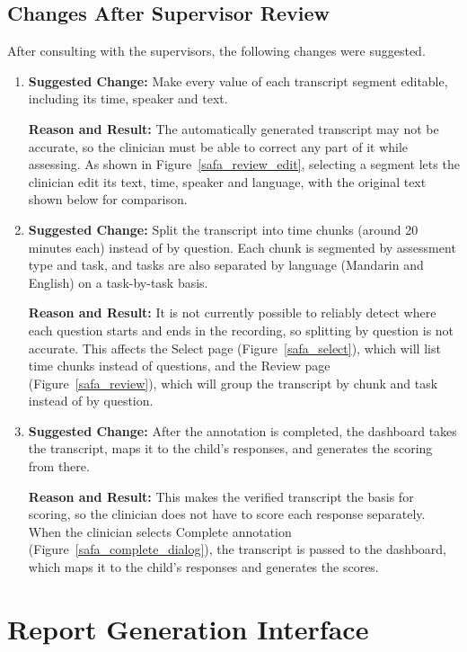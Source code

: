 \documentclass[12pt, titlepage]{article}
\begin{document}
\subsection{Changes After Supervisor Review}
\noindent After consulting with the supervisors, the following changes were suggested.
\begin{enumerate}
    \item \textbf{Suggested Change:} Make every value of each transcript segment editable, including its time, speaker and text.

    \textbf{Reason and Result:} The automatically generated transcript may not be accurate, so the clinician must be able to correct any part of it while assessing. As shown in Figure~\ref{safa_review_edit}, selecting a segment lets the clinician edit its text, time, speaker and language, with the original text shown below for comparison.

    \item \textbf{Suggested Change:} Split the transcript into time chunks (around 20 minutes each) instead of by question. Each chunk is segmented by assessment type and task, and tasks are also separated by language (Mandarin and English) on a task-by-task basis.

    \textbf{Reason and Result:} It is not currently possible to reliably detect where each question starts and ends in the recording, so splitting by question is not accurate. This affects the Select page (Figure~\ref{safa_select}), which will list time chunks instead of questions, and the Review page (Figure~\ref{safa_review}), which will group the transcript by chunk and task instead of by question.

    \item \textbf{Suggested Change:} After the annotation is completed, the dashboard takes the transcript, maps it to the child's responses, and generates the scoring from there.

    \textbf{Reason and Result:} This makes the verified transcript the basis for scoring, so the clinician does not have to score each response separately. When the clinician selects Complete annotation (Figure~\ref{safa_complete_dialog}), the transcript is passed to the dashboard, which maps it to the child's responses and generates the scores.
\end{enumerate}


\section{Report Generation Interface}
\end{document}
